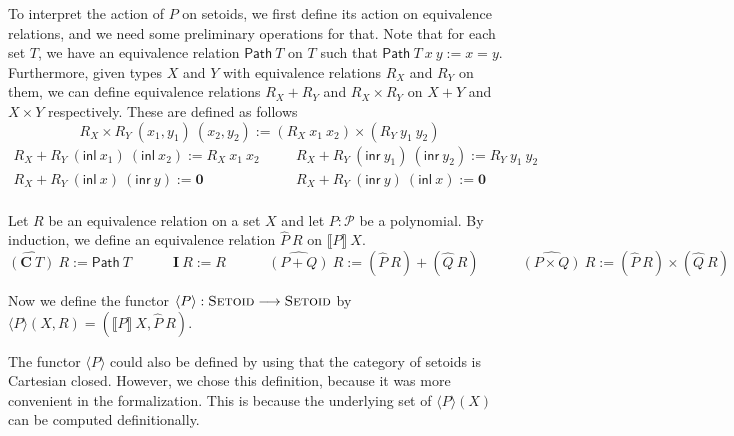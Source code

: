\documentclass[9pt]{entcs}
\newcommand{\term}[1]{\mathsf{#1}}
\newcommand{\constructor}[1]{\mathbf{#1}}
\newcommand{\category}[1]{\textsc{#1}}
\newcommand{\function}[1]{\mathsf{#1}}
\newcommand{\0}{\textbf{0}} %
\newcommand{\inl}{\term{inl}} %
\newcommand{\inr}{\term{inr}} %
\newcommand{\Def}{:=} %
\newcommand{\setoids}{\category{Setoid}} %
\newcommand{\functor}[2]{#1 \longrightarrow #2} %
\newcommand{\poly}{\mathcal{P}} %
\newcommand{\C}{\constructor{C}} %
\newcommand{\I}{\constructor{I}} %
\newcommand{\sumP}[2]{#1 + #2} %
\newcommand{\prodP}[2]{#1 \times #2} %
\newcommand{\pathR}[1]{\function{Path} \> #1} %
\newcommand{\sumR}[2]{#1 + #2} %
\newcommand{\prodR}[2]{#1 \times #2} %
\newcommand{\polyR}[2]{\widehat{#1} \> #2} %
\newcommand{\semP}[1]{\llbracket #1 \rrbracket} %
\newcommand{\semPT}[1]{\langle #1 \rangle} %
\newcommand{\remove}[1]{} %
\begin{document}
To interpret the action of $P$ on setoids, we first define its action on equivalence relations, and we need some preliminary operations for that.
Note that for each set $T$, we have an equivalence relation $\pathR{T}$ on $T$ such that $\pathR{T} \> x \> y \Def x = y$.
Furthermore, given types $X$ and $Y$ with equivalence relations $R_X$ and $R_Y$ on them, we can define equivalence relations $\sumR{R_X}{R_Y}$ and $\prodR{R_X}{R_Y}$ on $X + Y$ and $X \times Y$ respectively.
These are defined as follows
\[
\prodR{R_X}{R_Y} \> (x_1,y_1) \> (x_2,y_2) \Def (R_X \> x_1 \> x_2) \times (R_Y \> y_1 \> y_2)
\]
\[
\begin{array}{ccc}
\sumR{R_X}{R_Y} \> (\inl \> x_1) \> (\inl \> x_2) \Def R_X \> x_1 \> x_2 & \quad & \sumR{R_X}{R_Y} \> (\inr \> y_1) \> (\inr \> y_2) \Def R_Y \> y_1 \> y_2\\
\sumR{R_X}{R_Y} \> (\inl \> x) \> (\inr \> y) \Def \0 & \quad & \sumR{R_X}{R_Y} \> (\inr \> y) \> (\inl \> x) \Def \0\\ 
\end{array}
\]

\begin{definition}
Let $R$ be an equivalence relation on a set $X$ and let $P : \poly$ be a polynomial.
By induction, we define an equivalence relation $\polyR{P}{R}$ on $\semP{P} \> X$.
\[
\polyR{(\C \> T)}{R} \Def \pathR{T}
\quad \quad \quad
\polyR{\I}{R} \Def R
\quad \quad \quad
\polyR{(\sumP{P}{Q})}{R} \Def \sumR{(\polyR{P}{R})}{(\polyR{Q}{R})}
\quad \quad \quad
\polyR{(\prodP{P}{Q})}{R} \Def \prodR{(\polyR{P}{R})}{(\polyR{Q}{R})}
\]
\remove{
\begin{itemize}
	\item $\polyR{(\C \> T)}{R} \Def \pathR{T}$;
	\item $\polyR{\I}{R} \Def R$;
	\item $\polyR{(\sumP{P}{Q})}{R} \Def \sumR{(\polyR{P}{R})}{(\polyR{Q}{R})}$;
	\item $\polyR{(\prodP{P}{Q})}{R} \Def \prodR{(\polyR{P}{R})}{(\polyR{Q}{R})}$.
\end{itemize}
}
Now we define the functor $\semPT{P} : \functor{\setoids}{\setoids}$ by $\semPT{P}(X,R) = (\semP{P} \> X, \polyR{P}{R})$.
\end{definition}

The functor $\semPT{P}$ could also be defined by using that the category of setoids is Cartesian closed.
However, we chose this definition, because it was more convenient in the formalization.
This is because the underlying set of $\semPT{P}(X)$ can be computed definitionally.
\end{document}
